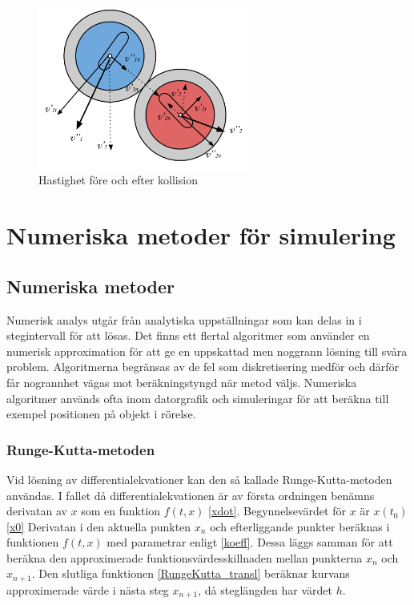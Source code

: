 \documentclass[11pt]{article} %
\begin{document}
\begin{figure}[ht!]
\centering
\includegraphics[width=70mm]{efter-krock.png}
\caption{Hastighet före och efter kollision}
\label{fig:efter-krock}
\label{overflow}
\end{figure}


\section{Numeriska metoder för simulering}

\subsection{Numeriska metoder}
Numerisk analys utgår från analytiska uppställningar som kan delas in i stegintervall för
att lösas. Det finns ett flertal algoritmer som använder en numerisk approximation för
att ge en uppskattad men noggrann lösning till svåra problem. Algoritmerna begränsas
av de fel som diskretisering medför och därför får nogrannhet vägas mot beräkningstyngd
när metod väljs. Numeriska algoritmer används ofta inom datorgrafik och simuleringar
för att beräkna till exempel positionen på objekt i rörelse.

\subsubsection{Runge-Kutta-metoden}
Vid lösning av differentialekvationer kan den så kallade Runge-Kutta-metoden användas.
I fallet då differentialekvationen är av första ordningen benämns derivatan av $x$ som en
funktion $f(t, x)$ \eqref{xdot}. 
Begynnelsevärdet för $x$ är $x(t_0)$ \eqref{x0}
Derivatan i den aktuella punkten $x_n$ och efterliggande punkter
beräknas i funktionen $f(t, x)$ med parametrar enligt \eqref{koeff}. Dessa läggs samman för att
beräkna den approximerade funktionsvärdesskillnaden mellan punkterna $x_n$ och $x_{n+1}$.
Den slutliga funktionen \eqref{RungeKutta_transl} beräknar kurvans approximerade värde i nästa steg $x_{n+1}$,
då steglängden har värdet $h$.
\end{document}
